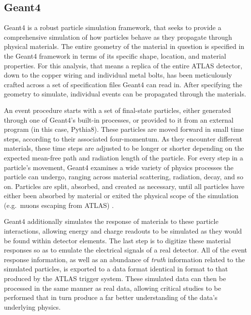     \subsection{Geant4}

    Geant4 is a robust particle simulation framework,
        that seeks to provide a comprehensive simulation of how particles behave as they propagate through physical materials.
    The entire geometry of the material in question is specified in the Geant4 framework in terms of
        its specific shape, location, and material properties.
    For this analysis, that means a replica of the entire ATLAS detector,
        down to the copper wiring and individual metal bolts,
        has been meticulously crafted across a set of specification files Geant4 can read in.
    After specifying the geometry to simulate, individual events can be propagated through the materials.

    An event procedure starts with a set of final-state particles,
        either generated through one of Geant4's built-in processes,
        or provided to it from an external program (in this case, Pythia8).
    These particles are moved forward in small time steps, according to their associated four-momentum.
    As they encounter different materials,
        these time steps are adjusted to be longer or shorter depending on
        the expected mean-free path and radiation length of the particle.
    For every step in a particle's movement,
        Geant4 examines a wide variety of physics processes the particle can undergo,
        ranging across material scattering, radiation, decay, and so on.
    Particles are split, absorbed, and created as necessary,
        until all particles have either been absorbed by material
        or exited the physical scope of the simulation (e.g.\ muons escaping from ATLAS) \cite{geant4}.

    Geant4 additionally simulates the response of materials to these particle interactions,
        allowing energy and charge readouts to be simulated as they would be found within detector elements.
    The last step is to digitize these material responses so as to emulate the electrical signals of a real detector.
    All of the event response information, as well as an abundance of \textit{truth} information related to the simulated particles,
        is exported to a data format identical in format to that produced by the ATLAS trigger system.
    These simulated data can then be processed in the same manner as real data,
        allowing critical studies to be performed that in turn produce
        a far better understanding of the data's underlying physics.

